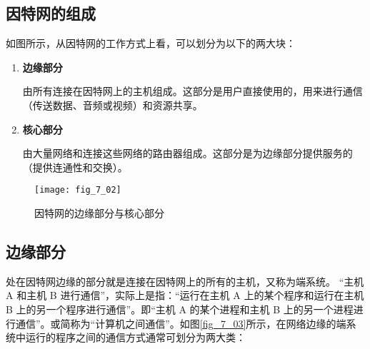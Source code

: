 \subsection{因特网的组成}

如图所示，从因特网的工作方式上看，可以划分为以下的两大块：
\begin{enumerate}
  \item \textbf{边缘部分}

  由所有连接在因特网上的主机组成。这部分是用户直接使用的，用来进行通信（传送数据、音频或视频）和资源共享。
  \item \textbf{核心部分}

  由大量网络和连接这些网络的路由器组成。这部分是为边缘部分提供服务的（提供连通性和交换）。
\end{enumerate}

\begin{figure}
  \centering
  \texttt{[image: fig\_7\_02]}
  \caption{因特网的边缘部分与核心部分}\label{fig_7_02}
\end{figure}



\subsection{边缘部分}

处在因特网边缘的部分就是连接在因特网上的所有的主机，又称为端系统。 “主机 A 和主机 B 进行通信”，实际上是指：“运行在主机 A 上的某个程序和运行在主机 B 上的另一个程序进行通信”。即“主机 A 的某个进程和主机 B 上的另一个进程进行通信”。或简称为“计算机之间通信”。如图\ref{fig_7_03}所示，在网络边缘的端系统中运行的程序之间的通信方式通常可划分为两大类：

